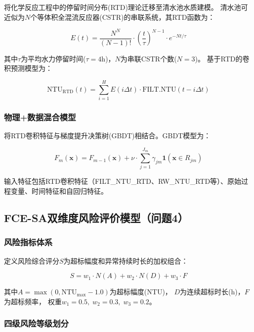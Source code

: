 \documentclass[12pt,a4paper]{ctexart}
\begin{document}
将化学反应工程中的停留时间分布(RTD)理论\cite{ref4}迁移至清水池水质建模。
清水池可近似为$N$个等体积全混流反应器(CSTR)的串联系统，其RTD函数为：

\begin{equation}\label{eq:rtd}
E(t) = \frac{N^N}{(N-1)!} \cdot \left(\frac{t}{\tau}\right)^{N-1} \cdot e^{-Nt/\tau}
\end{equation}

其中$\tau$为平均水力停留时间($\tau=4$h)，$N$为串联CSTR个数($N=3$)。
基于RTD的卷积预测模型为：

\begin{equation}\label{eq:rtd_conv}
\mathrm{NTU}_{\mathrm{RTD}}(t) = \sum_{i=1}^{H} E(i\Delta t) \cdot \mathrm{FILT.NTU}(t - i\Delta t)
\end{equation}

\subsubsection{物理+数据混合模型}

将RTD卷积特征与梯度提升决策树(GBDT)\cite{ref8}相结合。GBDT模型为：

\begin{equation}\label{eq:gbdt}
F_m(\mathbf{x}) = F_{m-1}(\mathbf{x}) + \nu \cdot \sum_{j=1}^{J_m} \gamma_{jm} \mathbf{1}(\mathbf{x} \in R_{jm})
\end{equation}

输入特征包括RTD卷积特征（FILT\_NTU\_RTD、RW\_NTU\_RTD等）、原始过程变量、时间特征和自回归特征。

\subsection{FCE-SA双维度风险评价模型（问题4）}

\subsubsection{风险指标体系}

定义风险综合评分$S$为超标幅度和异常持续时长的加权组合\cite{ref11}：

\begin{equation}\label{eq:risk}
S = w_1 \cdot N(A) + w_2 \cdot N(D) + w_3 \cdot F
\end{equation}

其中$A = \max(0, \mathrm{NTU}_{\max} - 1.0)$为超标幅度(NTU)，
$D$为连续超标时长(h)，$F$为超标频率，
权重$w_1=0.5,\; w_2=0.3,\; w_3=0.2$。

\subsubsection{四级风险等级划分}
\end{document}
